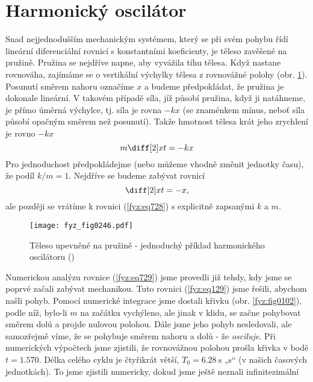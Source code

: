   \section{Harmonický oscilátor}\label{fyz:IchapXXIsecII}
    Snad nejjednodušším mechanickým systémem, který se při svém pohybu řídí lineární diferenciální
    rovnicí s konstantními koeficienty, je těleso zavěšené na pružině. Pružina se nejdříve napne,
    aby vyvážila tíhu tělesa. Když nastane rovnováha, zajímáme se o vertikální výchylky tělesa z
    rovnovážné polohy (obr. \ref{fyz:fig0246}). Posunutí směrem nahoru označíme \(x\) a budeme
    předpokládat, že pružina je dokonale lineární. V takovém případě síla, jíž působí pružina, když
    ji natáhneme, je přímo úměrná výchylce, tj. síla je rovna \(-kx\) (se znaménkem mínus, neboť
    síla působí opačným směrem než posunutí). Takže hmotnost tělesa krát jeho zrychlení je rovno
    \(-kx\)
    \begin{equation}\label{fyz:eq728}
      m\diff[2]xt = -kx
    \end{equation}
    Pro jednoduchost předpokládejme (nebo můžeme vhodně změnit jednotky času), že podíl
    \(k/m =1\). Nejdříve se budeme zabývat rovnicí
    \begin{equation}\label{fyz:eq729}
      \diff[2]xt = -x,
    \end{equation}
    ale později se vrátíme k rovnici (\ref{fyz:eq728}) s explicitně zapsanými \(k\) a \(m\).
    \begin{figure}[ht!] %
      \centering
      \texttt{[image: fyz\_fig0246.pdf]}
      \caption{Těleso upevněné na pružině - jednoduchý příklad harmonického oscilátoru
               (\cite[s.~287]{Feynman01})}
      \label{fyz:fig0246}
    \end{figure}
    Numerickou analýzu rovnice (\ref{fyz:eq729}) jsme provedli již tehdy, kdy jsme se poprvé začali
    zabývat mechanikou. Tuto rovnici (\ref{fyz:eq129}) jsme řešili, abychom našli pohyb. Pomocí
    numerické integrace jsme dostali křivku (obr. \ref{fyz:fig0102}), podle níž, bylo-li \(m\) na
    začátku vychýleno, ale jinak v klidu, se začne pohybovat směrem dolů a projde nulovou polohou.
    Dále jsme jeho pohyb nesledovali, ale samozřejmě víme, že se pohybuje směrem nahoru a dolů - že
    \emph{osciluje}. Při numerických výpočtech jsme zjistili, že rovnovážnou polohou prošla křivka v
    bodě \(t= \num{1.570}\). Délka celého cyklu je čtyřikrát větší, \(T_0 =\qty{6.28}{\s}\) „s“ (v
    našich časových jednotkách). To jsme zjistili numericky, dokud jsme ještě neznali inﬁnitezimální
